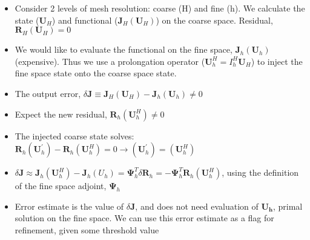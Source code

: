 \begin{itemize}
\item Consider 2 levels of mesh resolution: coarse (H) and fine (h). We calculate the state ($\mathbf{U}_H$) and functional ($\mathbf{J}_H(\mathbf{U}_H)$) on the coarse space. Residual, $\mathbf{R}_H(\mathbf{U}_H) = 0$
\item We would like to evaluate the functional on the fine space, $\mathbf{J}_h(\mathbf{U}_h)$ (expensive). Thus we use a prolongation operator ($\mathbf{U}_h^H = I_h^H \mathbf{U}_H$) to inject the fine space state onto the coarse space state.
\item The output error, $\delta \mathbf{J} \equiv \mathbf{J}_H(\mathbf{U}_H) - \mathbf{J}_h(\mathbf{U}_h) \neq 0$
\item Expect the new residual, $\mathbf{R}_h(\mathbf{U}_h^H) \neq 0$ 
\item The injected coarse state solves: $ \mathbf{R}_h(\mathbf{U}_h^\prime) - \mathbf{R}_h(\mathbf{U}_h^H) = 0 \rightarrow (\mathbf{U}_h^\prime) = (\mathbf{U}_h^H)$
\item $ \delta \mathbf{J} \approx  \mathbf{J}_h(\mathbf{U}_h^H) - \mathbf{J}_h(U_h) = \mathbf{\Psi}_h^T \delta \mathbf{R}_h = -\mathbf{\Psi}_h^T \mathbf{R}_h(\mathbf{U}_h^H)   $, using the definition of the fine space adjoint, $\mathbf{\Psi}_h$
\item Error estimate is the value of $\delta \mathbf{J}$, and does not need evaluation of $\mathbf{U_h}$, primal solution on the fine space. We can use this error estimate as a flag for refinement, given some threshold value
\end{itemize}

 
 

